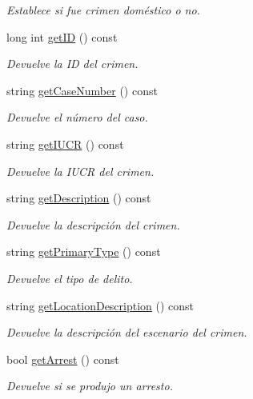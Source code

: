 \begin{DoxyCompactItemize}
\begin{DoxyCompactList}\small\item\em Establece si fue crimen doméstico o no. \end{DoxyCompactList}\item 
long int \hyperlink{classcrimen_a855eab30a304a6498828cb5d85a4e0e3}{get\-I\-D} () const 
\begin{DoxyCompactList}\small\item\em Devuelve la I\-D del crimen. \end{DoxyCompactList}\item 
string \hyperlink{classcrimen_ab3c025eb20cdcea9192ee190fa2af015}{get\-Case\-Number} () const 
\begin{DoxyCompactList}\small\item\em Devuelve el número del caso. \end{DoxyCompactList}\item 
string \hyperlink{classcrimen_a8738020069c3a3b3500d044f9580f93a}{get\-I\-U\-C\-R} () const 
\begin{DoxyCompactList}\small\item\em Devuelve la I\-U\-C\-R del crimen. \end{DoxyCompactList}\item 
string \hyperlink{classcrimen_a61789d65209d167149df197272d8feba}{get\-Description} () const 
\begin{DoxyCompactList}\small\item\em Devuelve la descripción del crimen. \end{DoxyCompactList}\item 
string \hyperlink{classcrimen_ae47e93acec39b388cde221a679bccf9c}{get\-Primary\-Type} () const 
\begin{DoxyCompactList}\small\item\em Devuelve el tipo de delito. \end{DoxyCompactList}\item 
string \hyperlink{classcrimen_a9de655b3eea3592f6e5d017e83fd6060}{get\-Location\-Description} () const 
\begin{DoxyCompactList}\small\item\em Devuelve la descripción del escenario del crimen. \end{DoxyCompactList}\item 
bool \hyperlink{classcrimen_a6cab67bfdad566ce444236fc7c8df312}{get\-Arrest} () const 
\begin{DoxyCompactList}\small\item\em Devuelve si se produjo un arresto. \end{DoxyCompactList}\item 

\end{DoxyCompactItemize}

